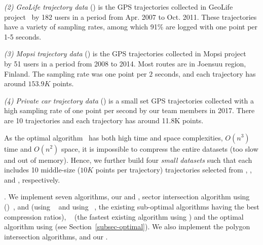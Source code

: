 \vspace{0.5ex}
\ni \emph{(2) GeoLife trajectory data} (\geolife) is the GPS trajectories collected in GeoLife project~\cite{Zheng:GeoLife} by 182 users in a period from Apr. 2007 to Oct. 2011. These trajectories have a variety of sampling rates, among which 91\% are logged with one point per 1-5 seconds. %

\vspace{0.5ex}
\ni \emph{(3) Mopsi trajectory data} (\mopsi) is the GPS trajectories collected in Mopsi project~\cite{Mopsi} by 51 users in a period from 2008 to 2014. Most routes are in Joensuu region, Finland.
The sampling rate was one point per $2$ seconds, and each trajectory has around $153.9K$ points.

\vspace{0.5ex}
\ni \emph{(4) Private car trajectory data} (\pricar) is a small set GPS trajectories collected with a high sampling rate of one point per second by our team members in 2017. There are 10 trajectories and each trajectory has around 11.8K points.


\vspace{0.5ex}
As the optimal \lsa algorithm~\cite{Imai:Optimal} has both high time and space complexities, \ie $O(n^3)$ time and $O(n^2)$ space, it is impossible to compress the entire datasets (too slow and out of memory). Hence, we further build four \textit{small datasets} such that each includes 10 middle-size ($10K$ points per trajectory) trajectories selected from \sercar, \geolife, \mopsi and \pricar, respectively.


.
We implement seven \lsa algorithms, \ie our \cist and \cista,  sector intersection algorithm using \ped ()~\cite{Dunham:Cone, Zhao:Sleeve},  and \dps (\dpa using \ped~\cite{Douglas:Peucker} and \dpa using \sed~\cite{Meratnia:Spatiotemporal}, the existing sub-optimal \lsa algorithms having the best compression ratios), \squishe~\cite{Muckell:Compression} (the fastest existing \lsa algorithm using \sed) and the optimal \lsa algorithm using \sed (see Section~\ref{subsec-optimal}).
We also implement the polygon intersection algorithms, \cpia and our \rpia.

